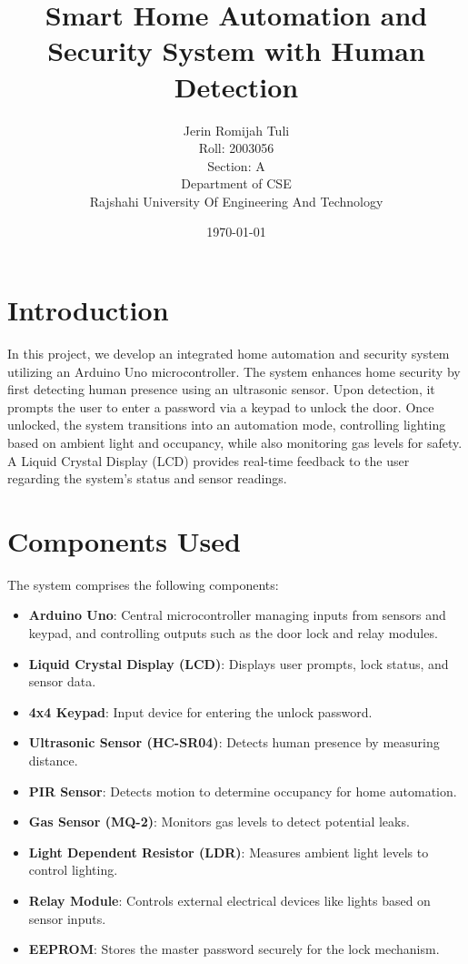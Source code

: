 \documentclass[a4paper,12pt]{article}
\title{\textbf{Smart Home Automation and Security System with Human Detection}\\}
\author{Jerin Romijah Tuli \\ Roll: 2003056 \\ Section: A \\ Department of CSE \\ Rajshahi University Of Engineering And Technology}
\date{\today}
\begin{document}
\maketitle

\section{Introduction}
In this project, we develop an integrated home automation and security system utilizing an Arduino Uno microcontroller. The system enhances home security by first detecting human presence using an ultrasonic sensor. Upon detection, it prompts the user to enter a password via a keypad to unlock the door. Once unlocked, the system transitions into an automation mode, controlling lighting based on ambient light and occupancy, while also monitoring gas levels for safety. A Liquid Crystal Display (LCD) provides real-time feedback to the user regarding the system's status and sensor readings.

\section{Components Used}
The system comprises the following components:
\begin{itemize}
    \item \textbf{Arduino Uno}: Central microcontroller managing inputs from sensors and keypad, and controlling outputs such as the door lock and relay modules.
    \item \textbf{Liquid Crystal Display (LCD)}: Displays user prompts, lock status, and sensor data.
    \item \textbf{4x4 Keypad}: Input device for entering the unlock password.
    \item \textbf{Ultrasonic Sensor (HC-SR04)}: Detects human presence by measuring distance.
    \item \textbf{PIR Sensor}: Detects motion to determine occupancy for home automation.
    \item \textbf{Gas Sensor (MQ-2)}: Monitors gas levels to detect potential leaks.
    \item \textbf{Light Dependent Resistor (LDR)}: Measures ambient light levels to control lighting.
    \item \textbf{Relay Module}: Controls external electrical devices like lights based on sensor inputs.
    \item \textbf{EEPROM}: Stores the master password securely for the lock mechanism.
\end{itemize}
\end{document}
